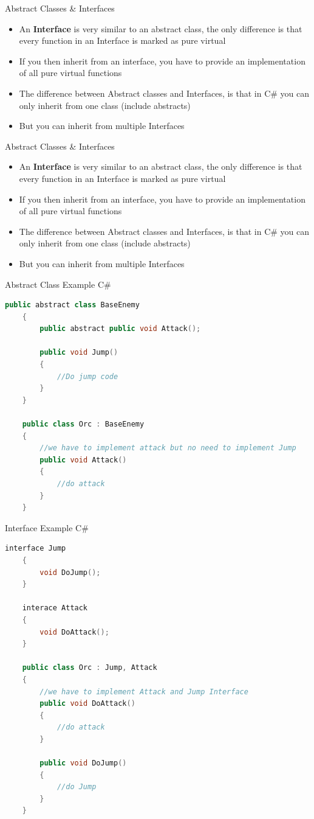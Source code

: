 \begin{frame}{Abstract Classes \& Interfaces}
	\begin{itemize}
		\pause \item An \textbf{Interface} is very similar to an abstract class, the only difference is that every function in an Interface is marked as pure virtual
		\pause \item If you then inherit from an interface, you have to provide an implementation of all pure virtual functions
		\pause \item The difference between Abstract classes and Interfaces, is that in C\# you can only inherit from one class (include abstracts)
		\pause \item But you can inherit from multiple Interfaces
	\end{itemize}
\end{frame}

\begin{frame}{Abstract Classes \& Interfaces}
	\begin{itemize}
		\pause \item An \textbf{Interface} is very similar to an abstract class, the only difference is that every function in an Interface is marked as pure virtual
		\pause \item If you then inherit from an interface, you have to provide an implementation of all pure virtual functions
		\pause \item The difference between Abstract classes and Interfaces, is that in C\# you can only inherit from one class (include abstracts)
		\pause \item But you can inherit from multiple Interfaces
	\end{itemize}
\end{frame}

\begin{frame}[fragile]{Abstract Class Example C\#}
	\begin{lstlisting}[language=C++,basicstyle=\tiny,]
	public abstract class BaseEnemy
	{
		public abstract public void Attack();
		
		public void Jump()
		{
			//Do jump code
		}
	}
	
	public class Orc : BaseEnemy
	{
		//we have to implement attack but no need to implement Jump
		public void Attack()
		{
			//do attack
		}
	}
	\end{lstlisting}
\end{frame}

\begin{frame}[fragile]{Interface Example C\#}
	\begin{lstlisting}[language=C++,basicstyle=\tiny,]
	interface Jump
	{
		void DoJump();
	}
	
	interace Attack
	{
		void DoAttack();
	}
	
	public class Orc : Jump, Attack
	{
		//we have to implement Attack and Jump Interface
		public void DoAttack()
		{
			//do attack
		}
		
		public void DoJump()
		{
			//do Jump
		}
	}
	\end{lstlisting}
\end{frame}


